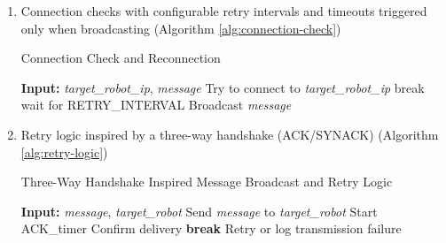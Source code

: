 \begin{enumerate}
    \item Connection checks with configurable retry intervals and timeouts triggered only when broadcasting (Algorithm \ref{alg:connection-check})
    \begin{algorithm} [H]
        \caption{Connection Check and Reconnection}
        \label{alg:connection-check}
        \begin{algorithmic} [1]
            \STATE \textbf{Input:} \textit{target\_robot\_ip}, \textit{message}
                        \STATE Try to connect to \textit{target\_robot\_ip}
                            \STATE break
                        \ELSE
                            \STATE wait for RETRY\_INTERVAL
                        \ENDIF
                    \ENDFOR
                \ENDIF
                    \STATE Broadcast \textit{message}
                \ENDIF
            \ENDIF
        \end{algorithmic}
    \end{algorithm}
    
    \item Retry logic inspired by a three-way handshake (ACK/SYNACK) (Algorithm \ref{alg:retry-logic})
    \begin{algorithm} [H]
        \caption{Three-Way Handshake Inspired Message Broadcast and Retry Logic}
        \label{alg:retry-logic}
        \begin{algorithmic} [1]
            \STATE \textbf{Input:} \textit{message}, \textit{target\_robot}
            \STATE Send \textit{message} to \textit{target\_robot}
            \STATE Start ACK\_timer
                    \STATE Confirm delivery
                    \STATE \textbf{break}
                \ENDIF
            \ENDWHILE
                \STATE Retry or log transmission failure
            \ENDIF
        \end{algorithmic}
    \end{algorithm}


\end{enumerate}
